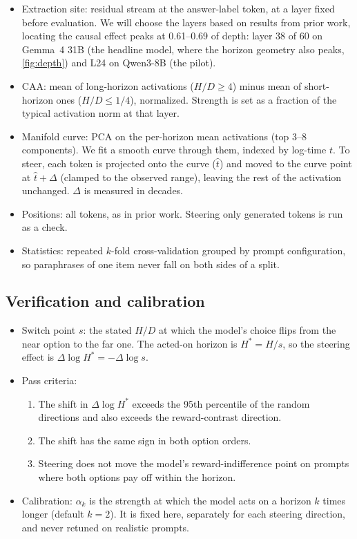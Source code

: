 \documentclass[midterm]{sparreport}
\begin{document}
\begin{itemize}
  \item Extraction site: residual stream at the answer-label token, at a layer fixed before evaluation. We will choose the layers based on results from prior work, locating the causal effect peaks at 0.61--0.69 of depth: layer 38 of 60 on Gemma~4 31B (the headline model, where the horizon geometry also peaks, \cref{fig:depth}) and L24 on Qwen3-8B (the pilot).
  \item CAA: mean of long-horizon activations ($H/D \geq 4$) minus mean of short-horizon ones ($H/D \leq 1/4$), normalized. Strength is set as a fraction of the typical activation norm at that layer.
  \item Manifold curve: PCA on the per-horizon mean activations (top 3--8 components). We fit a smooth curve through them, indexed by log-time $t$. To steer, each token is projected onto the curve ($\hat{t}$) and moved to the curve point at $\hat{t} + \Delta$ (clamped to the observed range), leaving the rest of the activation unchanged. $\Delta$ is measured in decades.
  \item Positions: all tokens, as in prior work. Steering only generated tokens is run as a check.
  \item Statistics: repeated $k$-fold cross-validation grouped by prompt configuration, so paraphrases of one item never fall on both sides of a split.
\end{itemize}

\subsection{Verification and calibration}
\label{app:verification}

\begin{itemize}
  \item Switch point $s$: the stated $H/D$ at which the model's choice flips from the near option to the far one. The acted-on horizon is $H^* = H / s$, so the steering effect is $\Delta \log H^* = -\Delta \log s$.
  \item Pass criteria:
  \begin{enumerate}
    \item The shift in $\Delta \log H^*$ exceeds the 95th percentile of the random directions and also exceeds the reward-contrast direction.
    \item The shift has the same sign in both option orders.
    \item Steering does not move the model's reward-indifference point on prompts where both options pay off within the horizon.
  \end{enumerate}
  \item Calibration: $\alpha_k$ is the strength at which the model acts on a horizon $k$ times longer (default $k = 2$). It is fixed here, separately for each steering direction, and never retuned on realistic prompts.
\end{itemize}
\end{document}

